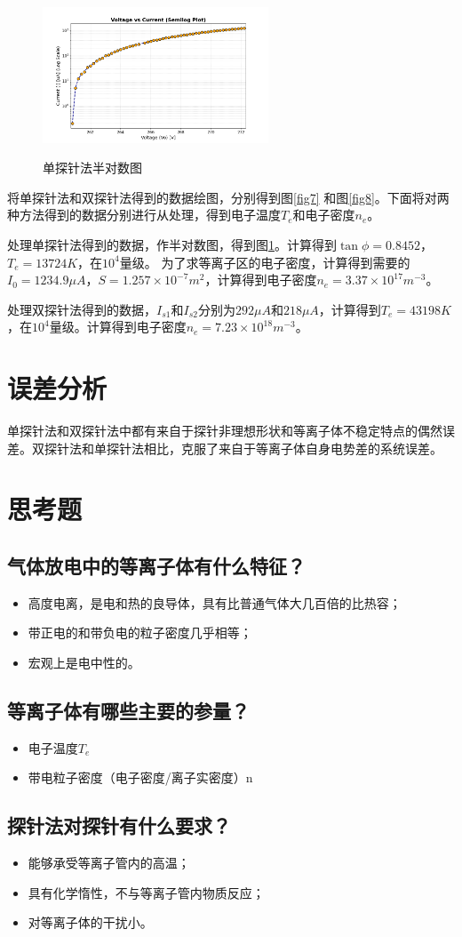 \documentclass[a4paper]{article}
\begin{document}
\begin{figure}[!h]
\centering
\includegraphics[width=0.6\textwidth]{data/Figure_1_2.png}\\
\caption{单探针法半对数图}\label{fig9}
\end{figure}
将单探针法和双探针法得到的数据绘图，分别得到图\ref{fig7} 和图\ref{fig8}。下面将对两种方法得到的数据分别进行从处理，得到电子温度$T_{e}$和电子密度$n_{e}$。

处理单探针法得到的数据，作半对数图，得到图\ref{fig9}。计算得到$\tan\phi=0.8452$，$T_{e}=13724K$，在$10^{4}$量级。
为了求等离子区的电子密度，计算得到需要的$I_0=1234.9  \mu A$，$S=1.257\times 10^{-7}m^{2}$，计算得到电子密度$n_{e}=3.37\times 10^{17} m^{-3}$。

处理双探针法得到的数据，$I_{s1}$和$I_{s2}$分别为$292\mu A$和$218\mu A$，计算得到$T_{e}=43198K$，在$10^{4}$量级。计算得到电子密度$n_{e}=7.23\times 10^{18} m^{-3}$。
\section{误差分析}
单探针法和双探针法中都有来自于探针非理想形状和等离子体不稳定特点的偶然误差。双探针法和单探针法相比，克服了来自于等离子体自身电势差的系统误差。
\section{思考题}
\subsection{气体放电中的等离子体有什么特征？}
\begin{itemize}
    \item 高度电离，是电和热的良导体，具有比普通气体大几百倍的比热容；
    \item 带正电的和带负电的粒子密度几乎相等；
    \item 宏观上是电中性的。
\end{itemize}
\subsection{等离子体有哪些主要的参量？}
\begin{itemize}
    \item 电子温度$T_{e}$
    \item 带电粒子密度（电子密度/离子实密度）n
\end{itemize}
\subsection{探针法对探针有什么要求？}
\begin{itemize}
    \item 能够承受等离子管内的高温；
    \item 具有化学惰性，不与等离子管内物质反应；
    \item 对等离子体的干扰小。
\end{itemize}
\nocite{jiaocai}

\end{document}
